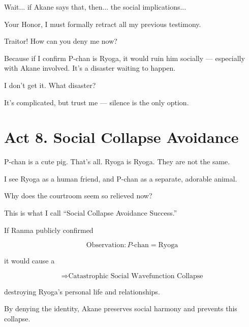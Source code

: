 \documentclass[12pt]{article}
\begin{document}
\begin{tcolorbox}[title={Ranma (alarmed):}]
Wait... if Akane says that, then... the social implications...
\end{tcolorbox}

\begin{tcolorbox}[title={Ranma (to Judge):}]
Your Honor, I must formally retract all my previous testimony.
\end{tcolorbox}

\begin{tcolorbox}[title={Ryoga (angrily):}]
Traitor! How can you deny me now?
\end{tcolorbox}

\begin{tcolorbox}[title={Ranma (frustrated):}]
Because if I confirm P-chan is Ryoga, it would ruin him socially — especially with Akane involved. It’s a disaster waiting to happen.
\end{tcolorbox}

\begin{tcolorbox}[title=Ryoga:]
I don’t get it. What disaster?
\end{tcolorbox}

\begin{tcolorbox}[title=Ranma:]
It’s complicated, but trust me — silence is the only option.
\end{tcolorbox}

\section*{Act 8. Social Collapse Avoidance}

\begin{tcolorbox}[title=Akane:]
P-chan is a cute pig. That’s all. Ryoga is Ryoga. They are not the same.
\end{tcolorbox}

\begin{tcolorbox}[title={Akane (continued):}]
I see Ryoga as a human friend, and P-chan as a separate, adorable animal.
\end{tcolorbox}

\begin{tcolorbox}[title={Judge (looking around):}]
Why does the courtroom seem so relieved now?
\end{tcolorbox}

\begin{tcolorbox}[title=Professor Wigner:]
This is what I call “Social Collapse Avoidance Success.”

If Ranma publicly confirmed

\[
\text{Observation}
:
P\text{-chan}=\text{Ryoga}
\]

it would cause a

\[
\Rightarrow
\text{Catastrophic Social Wavefunction Collapse}
\]

destroying Ryoga’s personal life and relationships.

By denying the identity, Akane preserves social harmony and prevents this collapse.
\end{tcolorbox}
\end{document}
